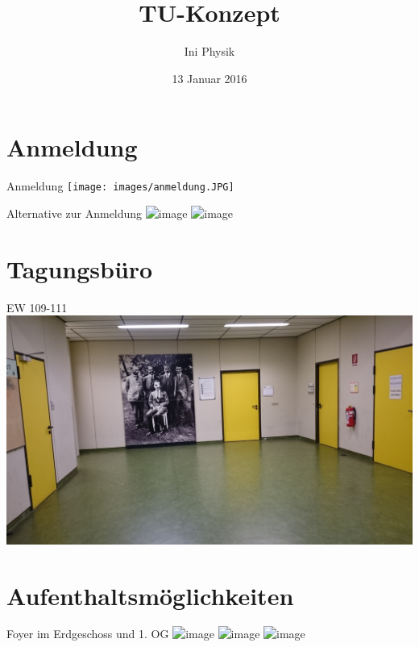 \documentclass[compress,]{beamer}
\title[TU-Konzept]{TU-Konzept}
\author{Ini Physik}
\institute[TU Berlin]
\begin{document}
\subject{Konzept an der TU}
\date{13 Januar 2016}

\begin{frame}
\titlepage
\end{frame}


\frame{\tableofcontents}

\section{Anmeldung}
\begin{frame}{Anmeldung}
  \texttt{[image: images/anmeldung.JPG]}
\end{frame}

\begin{frame}{Alternative zur Anmeldung}
	\includegraphics<1>[width=\textwidth]{images/bunker1.JPG}
	\includegraphics<2>[width=\textwidth]{images/bunker2.JPG}
\end{frame}

\section{Tagungsbüro}
\begin{frame}{EW 109-111}
  \includegraphics[width=\textwidth]{images/tagungsbuero1.JPG}
\end{frame}


\section{Aufenthaltsmöglichkeiten}
\begin{frame}{Foyer im Erdgeschoss und 1. OG}
  \includegraphics<1>[width=\textwidth]{images/foyer2.JPG}
  \includegraphics<2>[width=\textwidth]{images/foyer3.JPG}
  \includegraphics<3>[width=\textwidth]{images/foyer1.JPG}
\end{frame}
\end{document}
